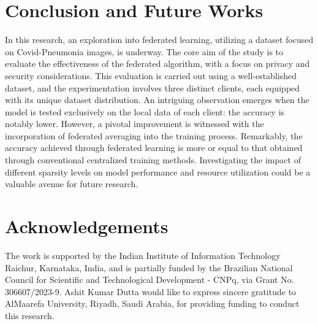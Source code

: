 \documentclass[conference]{IEEEtran}
\begin{document}
\section{Conclusion and Future Works}
In this research, an exploration into federated learning, utilizing a dataset focused on Covid-Pneumonia images, is underway. The core aim of the study is to evaluate the effectiveness of the federated algorithm, with a focus on privacy and security considerations. This evaluation is carried out using a well-established dataset, and the experimentation involves three distinct clients, each equipped with its unique dataset distribution. An intriguing observation emerges when the model is tested exclusively on the local data of each client: the accuracy is notably lower. However, a pivotal improvement is witnessed with the incorporation of federated averaging into the training process. Remarkably, the accuracy achieved through federated learning is more or equal to that obtained through conventional centralized training methods. Investigating the impact of different sparsity levels on model performance and resource utilization could be a valuable avenue for future research.


\section*{Acknowledgements} The work is supported by the Indian Institute of Information Technology Raichur, Karnataka, India, and is partially funded by the Brazilian National Council for Scientific and Technological Development - CNPq, via Grant No. 306607/2023-9. Ashit Kumar Dutta would like to express sincere gratitude to AlMaarefa University, Riyadh, Saudi Arabia, for providing funding to conduct this research.
\end{document}
